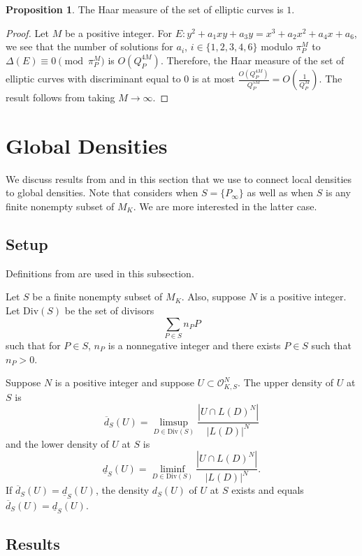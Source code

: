 \documentclass[12pt,letterpaper]{amsart}
\theoremstyle{definition}
\newtheorem{proposition}[theorem]{Proposition}
\begin{document}
\begin{proposition}
\label{densityec}
The Haar measure of the set of elliptic curves is $1$.
\end{proposition}

\begin{proof}

Let $M$ be a positive integer. For $E: y^2+a_1xy+a_3y=x^3+a_2x^2+a_4x+a_6$, we see that the number of solutions for $a_i$, $i\in\{1,2,3,4,6\}$ modulo $\pi_P^M$ to $\Delta(E)\equiv 0\pmod{\pi_P^M}$ is $O(Q_P^{4M})$. Therefore, the Haar measure of the set of elliptic curves with discriminant equal to $0$ is at most $\frac{O(Q_P^{4M})}{Q_P^{5M}}=O(\frac{1}{Q_P^M})$. The result follows from taking $M\rightarrow\infty$.
\end{proof}

\section{Global Densities}
\label{sec:global}

We discuss results from \cite{globaldensityfunc} and \cite{sqfree} in this section that we use to connect local densities to global densities. Note that \cite{sqfree} considers when $S=\{P_\infty\}$ as well as when $S$ is any finite nonempty subset of $M_K$. We are more interested in the latter case.

\subsection{Setup}
Definitions from \cite{globaldensityfunc} are used in this subsection.

Let $S$ be a finite nonempty subset of $M_K$. Also, suppose $N$ is a positive integer. Let $\text{Div}(S)$ be the set of divisors
\[
\sum_{P\in S} n_PP
\]
such that for $P\in S$, $n_P$ is a nonnegative integer and there exists $P\in S$ such that $n_P>0$. 

Suppose $N$ is a positive integer and suppose $U\subset\mathcal{O}_{K,S}^N$. The upper density of $U$ at $S$ is
\[
\overline{d}_S(U)=\limsup_{D\in\text{Div}(S)}\frac{|U\cap L(D)^N|}{|L(D)|^N}
\]
and the lower density of $U$ at $S$ is
\[
\underline{d}_S(U)=\liminf_{D\in\text{Div}(S)}\frac{|U\cap L(D)^N|}{|L(D)|^N}.
\]
If $\overline{d}_S(U)=\underline{d}_S(U)$, the density $d_S(U)$ of $U$ at $S$ exists and equals $\overline{d}_S(U)=\underline{d}_S(U)$.

\subsection{Results}
\end{document}
